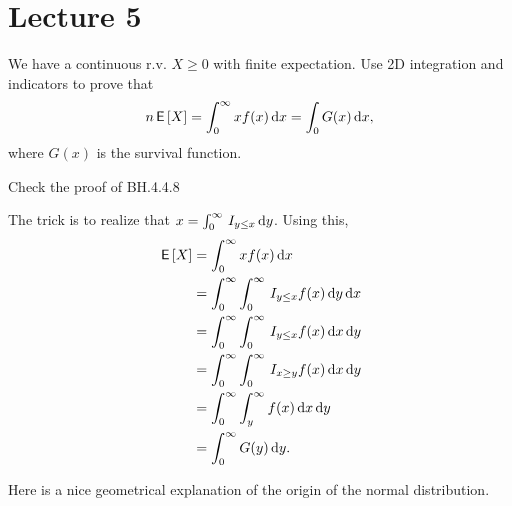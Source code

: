 \section{Lecture 5}
\label{sec:lecture-5}

\begin{exercise}
We have a continuous r.v. $X\geq 0$ with finite expectation. Use 2D integration and indicators to prove that
\begin{align}n
\,\mathsf{E}\left[X\right] = \int_{0}^{\infty} x f(x) \,\textrm{d}x = \int_{0} G(x) \,\textrm{d}x,
\end{align}
where $G(x)$ is the survival function.
\begin{hint}
  Check the proof of BH.4.4.8
\end{hint}
\begin{solution}
The trick is to realize that $x = \int_0^{\infty} \,I_{y\leq x} \,\textrm{d}y$. Using this,
\begin{align}
\,\mathsf{E}\left[X\right]
&= \int_{0}^{\infty} x f(x) \,\textrm{d}x \\
&= \int_{0}^{\infty} \int_{0}^{\infty} \,I_{y \leq x} f(x) \,\textrm{d}y \,\textrm{d}x \\
&= \int_{0}^{\infty} \int_{0}^{\infty} \,I_{y \leq x} f(x) \,\textrm{d}x \,\textrm{d}y \\
&= \int_{0}^{\infty} \int_{0}^{\infty} \,I_{x \geq y} f(x) \,\textrm{d}x \,\textrm{d}y \\
&= \int_{0}^{\infty} \int_{y}^{\infty} f(x) \,\textrm{d}x \,\textrm{d}y \\
&= \int_{0}^{\infty} G(y) \,\textrm{d}y.
\end{align}
\end{solution}
\end{exercise}



Here is a nice geometrical explanation of the origin of the normal distribution.

